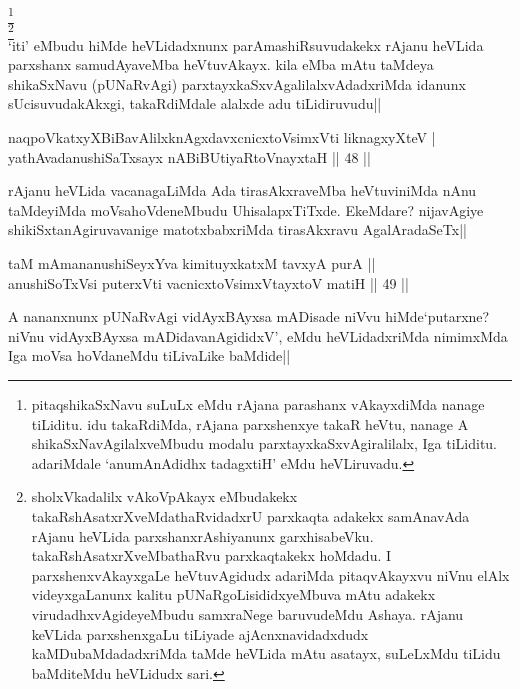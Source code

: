 \begin{artha}
\footnote[2]{pitaqshikaSxNavu suLuLx eMdu rAjana parashanx vAkayxdiMda 
nanage tiLiditu. idu takaRdiMda, rAjana parxshenxye takaR heVtu, 
nanage A shikaSxNavAgilalxveMbudu modalu parxtayxkaSxvAgiralilalx, Iga 
tiLiditu. adariMdale `anumAnAdidhx tadagxtiH' eMdu heVLiruvadu.}\\
\footnote[3]{sholxVkadalilx vAkoVpAkayx eMbudakekx 
takaRshAsatxrXveMdathaRvidadxrU parxkaqta adakekx samAnavAda rAjanu 
heVLida parxshanxrAshiyanunx garxhisabeVku. takaRshAsatxrXveMbathaRvu 
parxkaqtakekx hoMdadu. I parxshenxvAkayxgaLe heVtuvAgidudx adariMda 
pitaqvAkayxvu niVnu elAlx videyxgaLanunx kalitu 
pUNaRgoLisididxyeMbuva mAtu adakekx virudadhxvAgideyeMbudu samxraNege 
baruvudeMdu Ashaya. rAjanu keVLida parxshenxgaLu tiLiyade 
ajAcnxnavidadxdudx kaMDubaMdadadxriMda taMde heVLida mAtu asatayx, 
suLeLxMdu tiLidu baMditeMdu heVLidudx sari.}\\
`iti' eMbudu hiMde heVLidadxnunx parAmashiRsuvudakekx rAjanu heVLida 
parxshanx samudAyaveMba heVtuvAkayx. kila eMba mAtu taMdeya 
shikaSxNavu (pUNaRvAgi) parxtayxkaSxvAgalilalxvAdadxriMda idanunx 
sUcisuvudakAkxgi, takaRdiMdale alalxde adu tiLidiruvudu||
\end{artha}

\begin{shl}
naqpoVkatxyXBiBavAlilxknAgxdavxcnicxtoV\s simxVti liknagxyXteV | \\
yathAvadanushiSaTxsayx nABiBUtiyaRtoV\s nayxtaH \hfill|| 48 || 
\end{shl}

\begin{artha}
rAjanu heVLida vacanagaLiMda Ada tirasAkxraveMba heVtuviniMda 
nAnu taMdeyiMda moVsahoVdeneMbudu UhisalapxTiTxde. EkeMdare? 
nijavAgiye shikiSxtanAgiruvavanige matotxbabxriMda tirasAkxravu 
AgalAradaSeTx|| 
\end{artha}


\begin{shl}
taM mAmananushiSeyxYva kimituyxkatxM tavxyA purA || \\
anushiSoTxV\s si puterxVti vacnicxtoV\s simxVtayxtoV matiH \hfill|| 49 || 
\end{shl}

\begin{artha}
A nananxnunx pUNaRvAgi vidAyxBAyxsa mADisade niVvu hiMde`putarxne? 
niVnu vidAyxBAyxsa mADidavanAgididxV', eMdu heVLidadxriMda nimimxMda 
Iga moVsa hoVdaneMdu tiLivaLike baMdide||
\end{artha}

